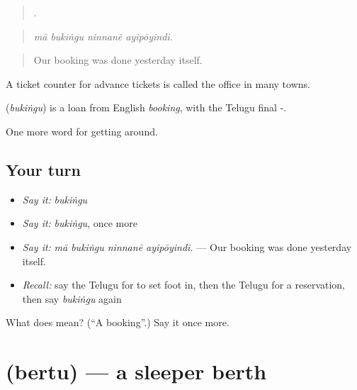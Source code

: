 \begin{quote}
   .
\end{quote}

\begin{quote}
\emph{mā bukiṅgu ninnanē ayipōyindi.}
\end{quote}

\begin{quote}
Our booking was done yesterday itself.
\end{quote}

A ticket counter for advance tickets is called the  office in many towns.

\begin{cousinweb}
\textbf{} (\emph{bukiṅgu}) is a loan from English \emph{booking}, with the Telugu final -.
\end{cousinweb}

\begin{grammarlens}[title={What you've built}]
One more word for getting around.
\end{grammarlens}

\subsection*{Your turn}
\begin{itemize}
\raggedright
  \item \emph{Say it:} \emph{bukiṅgu}
  \item \emph{Say it:} \emph{bukiṅgu}, once more
  \item \emph{Say it:} \emph{mā bukiṅgu ninnanē ayipōyindi.} — Our booking was done yesterday itself.
  \item \emph{Recall:} say the Telugu for to set foot in, then the Telugu for a reservation, then say \emph{bukiṅgu} again
\end{itemize}

\begin{tcolorbox}[breakable,colback=teal!4,colframe=teal!35!black,title={Before you move on}]
What does  mean? (\textquotedblleft{}A booking\textquotedblright{}.) Say it once more.
\end{tcolorbox}
\section[\texorpdfstring{\te{బెర్తు} (bertu)}{బెర్తు (bertu)}]{ (bertu) — a sleeper berth}

\label{lesson:TE-C439-bertu}



